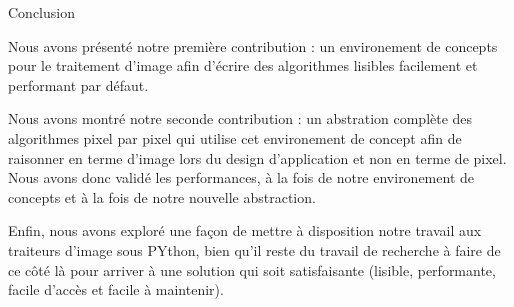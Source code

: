 \documentclass[12pt,aspectratio=169]{beamer}
\begin{document}
\begin{frame}{Conclusion}
{    Nous avons présenté notre première contribution : un environement de concepts pour le traitement d'image afin d'écrire des algorithmes lisibles facilement et performant par défaut.

    Nous avons montré notre seconde contribution : un abstration complète des algorithmes pixel par pixel qui utilise cet environement de concept afin de raisonner en terme d'image lors du design d'application et non en terme de pixel.
    Nous avons donc validé les performances, à la fois de notre environement de concepts et à la fois de notre nouvelle abstraction.

    Enfin, nous avons exploré une façon de mettre à disposition notre travail aux traiteurs d'image sous PYthon, bien qu'il reste du travail de recherche à faire de ce côté là pour arriver à une solution qui soit satisfaisante (lisible, performante, facile d'accès et facile à maintenir).
  }
\end{frame}
\end{document}
